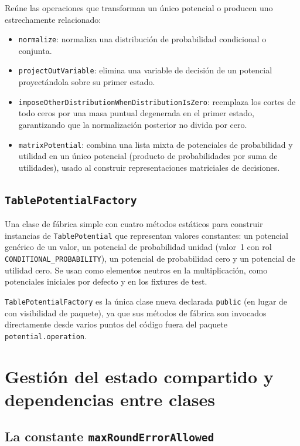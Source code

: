 \documentclass[11pt,a4paper]{article}
\newcommand{\code}[1]{\texttt{#1}}
\begin{document}
Re\'une las operaciones que transforman un \'unico potencial o producen uno
estrechamente relacionado:
\begin{itemize}
  \item \code{normalize}: normaliza una distribuci\'on de probabilidad condicional
        o conjunta.
  \item \code{projectOutVariable}: elimina una variable de decisi\'on de un
        potencial proyect\'andola sobre su primer estado.
  \item \code{imposeOtherDistributionWhenDistributionIsZero}: reemplaza los cortes
        de todo ceros por una masa puntual degenerada en el primer estado,
        garantizando que la normalizaci\'on posterior no divida por cero.
  \item \code{matrixPotential}: combina una lista mixta de potenciales de
        probabilidad y utilidad en un \'unico potencial (producto de probabilidades
        por suma de utilidades), usado al construir representaciones matriciales
        de decisiones.
\end{itemize}

\subsection{\code{TablePotentialFactory}}

Una clase de f\'abrica simple con cuatro m\'etodos est\'aticos para construir
instancias de \code{TablePotential} que representan valores constantes: un
potencial gen\'erico de un valor, un potencial de probabilidad unidad (valor~1 con
rol \code{CONDITIONAL\_PROBABILITY}), un potencial de probabilidad cero y un
potencial de utilidad cero.  Se usan como elementos neutros en la multiplicaci\'on,
como potenciales iniciales por defecto y en los fixtures de test.

\code{TablePotentialFactory} es la \'unica clase nueva declarada \code{public}
(en lugar de con visibilidad de paquete), ya que sus m\'etodos de f\'abrica son
invocados directamente desde varios puntos del c\'odigo fuera del paquete
\code{potential.operation}.

\section{Gesti\'on del estado compartido y dependencias entre clases}

\subsection{La constante \code{maxRoundErrorAllowed}}
\end{document}
